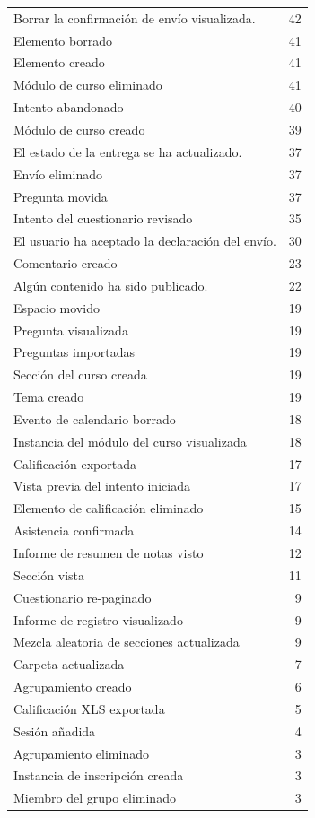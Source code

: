 \documentclass[notspecified,article,submit,moreauthors,pdftex]{Definitions/mdpi}
\begin{document}
\begin{longtable}[]{@{}lr@{}}
Borrar la confirmación de envío visualizada. & 42 \\
Elemento borrado & 41 \\
Elemento creado & 41 \\
Módulo de curso eliminado & 41 \\
Intento abandonado & 40 \\
Módulo de curso creado & 39 \\
El estado de la entrega se ha actualizado. & 37 \\
Envío eliminado & 37 \\
Pregunta movida & 37 \\
Intento del cuestionario revisado & 35 \\
El usuario ha aceptado la declaración del envío. & 30 \\
Comentario creado & 23 \\
Algún contenido ha sido publicado. & 22 \\
Espacio movido & 19 \\
Pregunta visualizada & 19 \\
Preguntas importadas & 19 \\
Sección del curso creada & 19 \\
Tema creado & 19 \\
Evento de calendario borrado & 18 \\
Instancia del módulo del curso visualizada & 18 \\
Calificación exportada & 17 \\
Vista previa del intento iniciada & 17 \\
Elemento de calificación eliminado & 15 \\
Asistencia confirmada & 14 \\
Informe de resumen de notas visto & 12 \\
Sección vista & 11 \\
Cuestionario re-paginado & 9 \\
Informe de registro visualizado & 9 \\
Mezcla aleatoria de secciones actualizada & 9 \\
Carpeta actualizada & 7 \\
Agrupamiento creado & 6 \\
Calificación XLS exportada & 5 \\
Sesión añadida & 4 \\
Agrupamiento eliminado & 3 \\
Instancia de inscripción creada & 3 \\
Miembro del grupo eliminado & 3 \\

\end{longtable}
\end{document}
